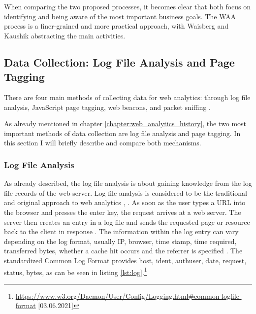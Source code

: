 When comparing the two proposed processes, it becomes clear that both focus on identifying and being aware of the most important business goals.
The WAA process is a finer-grained and more practical approach, with Waisberg and Kaushik abstracting the main activities.






\subsection{Data Collection: Log File Analysis and Page Tagging}
\label{chapter:web_analytics_logfile_pagetagging}

There are four main methods of collecting data for web analytics: through log file analysis, JavaScript page tagging, web beacons, and packet sniffing \cite{2009Waisberg}.

As already mentioned in chapter \ref{chapter:web_analytics_history},  the two most important methods of data collection are log file analysis and page tagging.
In this section I will briefly describe and compare both mechanisms.



\subsubsection{Log File Analysis}
\label{chapter:log_file}


As already described, the log file analysis is about gaining knowledge from the log file records of the web server.
Log file analysis is considered to be the traditional and original approach to web analytics \cite{2011Marek}, \cite{2015Zheng}. %
As soon as the user types a URL into the browser and presses the enter key, the request arrives at a web server.
The server then creates an entry in a log file and sends the requested page or resource back to the client in response \cite{2009Waisberg}.
The information within the log entry can vary depending on the log format, usually IP, browser, time stamp, time required, transferred bytes, whether a cache hit occurs and the referrer is specified \cite{2009Waisberg}.
The standardized Common Log Format provides host, ident, authuser, date, request, status, bytes, as can be seen in listing \ref{lst:log}.\footnote{\url{https://www.w3.org/Daemon/User/Config/Logging.html\#common-logfile-format} [03.06.2021]}

